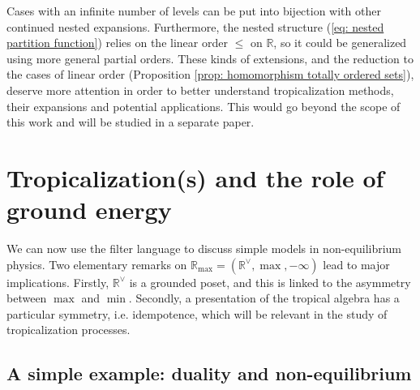 \documentclass[11pt,british,reqno]{article}
\numberwithin{equation}{section}
\numberwithin{figure}{section}
\numberwithin{table}{section}
\theoremstyle{definition}
\theoremstyle{definition}
\theoremstyle{plain}
\theoremstyle{plain}
\theoremstyle{remark}
\theoremstyle{plain}
\numberwithin{equation}{section}
\numberwithin{figure}{section}
\numberwithin{table}{section}
\theoremstyle{plain}
\begin{document}
Cases with an infinite number of levels can be put into bijection with
other continued nested expansions. Furthermore, the nested structure (\ref{eq: nested partition function}) relies on the linear order $\leq$ on $\mathbb{R}$, so it could be generalized using more general partial orders. These kinds of extensions, and the reduction to the cases of linear order (Proposition \ref{prop: homomorphism totally ordered sets}), deserve more attention in order to better  understand tropicalization methods, their expansions and potential applications. This would go beyond the scope of this work and will be studied in a separate paper. 


\section{\label{sec: Tropicalization(s) and the role of ground energy } Tropicalization(s)
and the role of ground energy }

We can now use the filter language to discuss simple models in non-equilibrium
physics. Two elementary remarks on $\mathbb{R}_{\max}=(\mathbb{R}^{\vee},\max,-\infty)$ lead to major implications. Firstly, $\mathbb{R}^{\vee}$ is a grounded poset, and this is linked to the asymmetry between $\max$ and $\min$. Secondly, a presentation of the tropical algebra has a particular symmetry, i.e. idempotence, which will be
relevant in the study of tropicalization processes.


\subsection{\label{subsec: Duality and non-equilibrium} A simple example: duality and non-equilibrium } 
\end{document}
